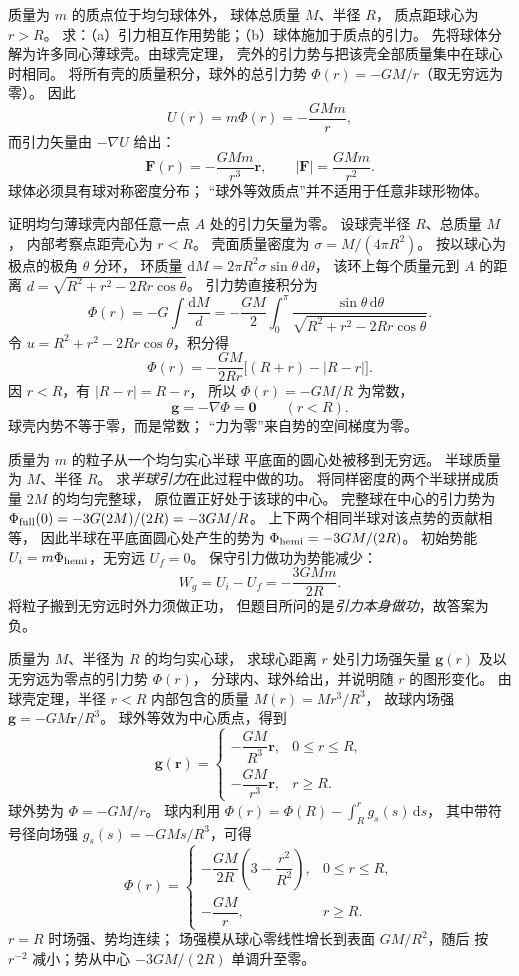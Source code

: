 质量为 $m$ 的质点位于均匀球体外，
球体总质量 $M$、半径 $R$，
质点距球心为 $r>R$。
求：（a）引力相互作用势能；（b）球体施加于质点的引力。
\exsolution
先将球体分解为许多同心薄球壳。由球壳定理，
壳外的引力势与把该壳全部质量集中在球心时相同。
将所有壳的质量积分，球外的总引力势
$\Phi(r)=-GM/r$（取无穷远为零）。
因此
\[
\boxed{U(r)=m\Phi(r)=-\frac{GMm}{r}},
\]
而引力矢量由 $-\nabla U$ 给出：
\[
\boxed{\bm F(r)=-\frac{GMm}{r^3}\bm r},
\qquad |\bm F|=\frac{GMm}{r^2}.
\]
\excheck 球体必须具有球对称密度分布；
“球外等效质点”并不适用于任意非球形物体。

证明均匀薄球壳内部任意一点 $A$ 处的引力矢量为零。
\exsolution
设球壳半径 $R$、总质量 $M$，
内部考察点距壳心为 $r<R$。
壳面质量密度为 $\sigma=M/(4\pi R^2)$。
按以球心为极点的极角 $\theta$ 分环，
环质量
$\mathrm dM=2\pi R^2\sigma\sin\theta\,\mathrm d\theta$，
该环上每个质量元到 $A$ 的距离
$d=\sqrt{R^2+r^2-2Rr\cos\theta}$。
引力势直接积分为
\[
\Phi(r)=-G\int\frac{\mathrm dM}{d}
=-\frac{GM}{2}\int_0^\pi
\frac{\sin\theta\,\mathrm d\theta}
{\sqrt{R^2+r^2-2Rr\cos\theta}}.
\]
令 $u=R^2+r^2-2Rr\cos\theta$，积分得
\[
\Phi(r)=-\frac{GM}{2Rr}
\bigl[(R+r)-|R-r|\bigr].
\]
因 $r<R$，有 $|R-r|=R-r$，
所以 $\Phi(r)=-GM/R$ 为常数，
\[
\boxed{\bm g=-\nabla\Phi=\bm0\qquad(r<R)}.
\]
\excheck 球壳内势不等于零，而是常数；
“力为零”来自势的空间梯度为零。

质量为 $m$ 的粒子从一个均匀实心半球
平底面的圆心处被移到无穷远。
半球质量为 $M$、半径 $R$。
求\emph{半球引力}在此过程中做的功。
\exsolution
将同样密度的两个半球拼成质量 $2M$ 的均匀完整球，
原位置正好处于该球的中心。
完整球在中心的引力势为
$\Phi_{\rm full}(0)=-3G(2M)/(2R)=-3GM/R$。
上下两个相同半球对该点势的贡献相等，
因此半球在平底面圆心处产生的势为
$\Phi_{\rm hemi}=-3GM/(2R)$。
初始势能 $U_i=m\Phi_{\rm hemi}$，无穷远 $U_f=0$。
保守引力做功为势能减少：
\[
\boxed{W_g=U_i-U_f=-\frac{3GMm}{2R}}.
\]
\excheck 将粒子搬到无穷远时外力须做正功，
但题目所问的是\emph{引力本身做功}，故答案为负。

质量为 $M$、半径为 $R$ 的均匀实心球，
求球心距离 $r$ 处引力场强矢量 $\bm g(r)$
及以无穷远为零点的引力势 $\Phi(r)$，
分球内、球外给出，并说明随 $r$ 的图形变化。
\exsolution
由球壳定理，半径 $r<R$ 内部包含的质量
$M(r)=M r^3/R^3$，
故球内场强
$\bm g=-GM\bm r/R^3$。
球外等效为中心质点，得到
\[
\boxed{\bm g(\bm r)=
\begin{cases}
-\dfrac{GM}{R^3}\bm r,&0\le r\le R,\\[4pt]
-\dfrac{GM}{r^3}\bm r,&r\ge R .
\end{cases}}
\]
球外势为 $\Phi=-GM/r$。
球内利用
$\Phi(r)=\Phi(R)-\int_R^r g_s(s)\,\mathrm ds$，
其中带符号径向场强 $g_s(s)=-GMs/R^3$，可得
\[
\boxed{\Phi(r)=
\begin{cases}
-\dfrac{GM}{2R}\left(3-\dfrac{r^2}{R^2}\right),
 &0\le r\le R,\\[4pt]
-\dfrac{GM}{r},&r\ge R .
\end{cases}}
\]
\excheck $r=R$ 时场强、势均连续；
场强模从球心零线性增长到表面 $GM/R^2$，随后
按 $r^{-2}$ 减小；势从中心 $-3GM/(2R)$ 单调升至零。

